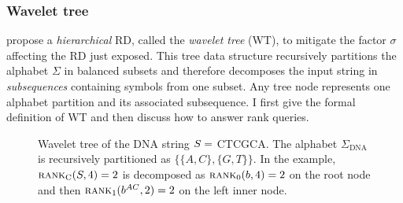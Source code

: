 
\subsubsection{Wavelet tree}

\citeauthor{Grossi2003} propose a \emph{hierarchical} RD, called the \emph{wavelet tree} (WT), to mitigate the factor $\sigma$ affecting the RD just exposed.
This tree data structure recursively partitions the alphabet $\Sigma$ in balanced subsets and therefore decomposes the input string in \emph{subsequences} containing symbols from one subset.
Any tree node represents one alphabet partition and its associated subsequence.
I first give the formal definition of WT and then discuss how to answer rank queries.


\begin{figure}[b]
\begin{center}
\caption[Example of wavelet tree]{Wavelet tree of the DNA string $S=$ {\ttfamily CTCGCA}. The alphabet $\Sigma_{\text{DNA}}$ is recursively partitioned as $\{ \{A,C\}, \{G,T\} \}$. In the example, $\textsc{rank}_{\text{C}}(S,4)=2$ is decomposed as $\textsc{rank}_0(b,4) = 2$ on the root node and then $\textsc{rank}_1(b^{AC}, 2) = 2$ on the left inner node.}
\label{fig:wt_dna}
\ttfamily

\end{center}
\end{figure}

